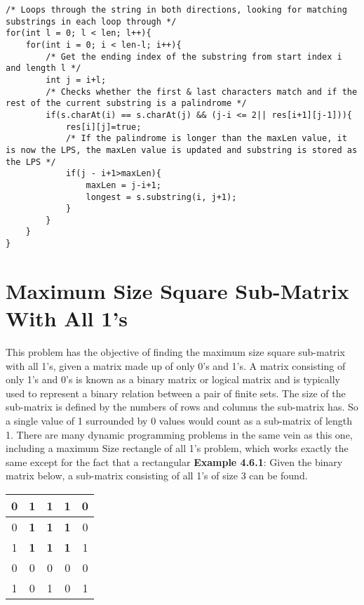
\smallbreak\noindent

\begin{lstlisting}
/* Loops through the string in both directions, looking for matching substrings in each loop through */
for(int l = 0; l < len; l++){
	for(int i = 0; i < len-l; i++){
		/* Get the ending index of the substring from start index i and length l */
		int j = i+l;
		/* Checks whether the first & last characters match and if the rest of the current substring is a palindrome */
		if(s.charAt(i) == s.charAt(j) && (j-i <= 2|| res[i+1][j-1])){
			res[i][j]=true;
			/* If the palindrome is longer than the maxLen value, it is now the LPS, the maxLen value is updated and substring is stored as the LPS */
			if(j - i+1>maxLen){
				maxLen = j-i+1; 
				longest = s.substring(i, j+1);
			}
		}
	}
}
\end{lstlisting}





\section{Maximum Size Square Sub-Matrix With All 1's}
This problem has the objective of finding the maximum size square sub-matrix with all 1's, given a matrix made up of only 0's and 1's. A matrix consisting of only 1's and 0's is known as a binary matrix or logical matrix and is typically used to represent a binary relation between a pair of finite sets. The size of the sub-matrix is defined by the numbers of rows and columns the sub-matrix has. So a single value of 1 surrounded by 0 values would count as a sub-matrix of length 1. There are many dynamic programming problems in the same vein as this one, including a maximum Size rectangle of all 1's problem, which works exactly the same except for the fact that a rectangular 
\medbreak
\textbf{Example 4.6.1}: Given the binary matrix below, a sub-matrix consisting of all 1's of size 3 can be found.

\begin{table}[h]
	\centering
	\begin{tabular}{|c|c|c|c|c|}
		\hline
		0 & \textbf{1} & \textbf{1} & \textbf{1} & 0 \\ \hline
		0 & \textbf{1} & \textbf{1} & \textbf{1} & 0 \\ \hline
		1 & \textbf{1} & \textbf{1} & \textbf{1} & 1 \\ \hline
		0 & 0 & 0 & 0 & 0 \\ \hline
		1 & 0 & 1 & 0 & 1 \\ \hline
	\end{tabular}
\end{table}

